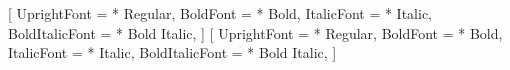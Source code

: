 %

\usepackage{xcolor}
\usepackage{fontspec}
\usepackage{graphicx}


\newif\ifuwdark
\uwdarkfalse   %

\setsansfont{Red Hat Display}[
  UprightFont    = * Regular,
  BoldFont       = * Bold,
  ItalicFont     = * Italic,
  BoldItalicFont = * Bold Italic,
]
\setmainfont{Red Hat Text}[
  UprightFont    = * Regular,
  BoldFont       = * Bold,
  ItalicFont     = * Italic,
  BoldItalicFont = * Bold Italic,
]


